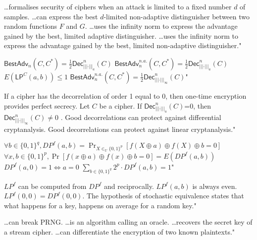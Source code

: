 {\ldots formalises security of ciphers when an attack is limited to a fixed number $d$ of samples.}
{\ldots can express the best $d$-limited non-adaptive distinguisher between two random functions $F$ and $G$.}
{\ldots uses the infinity norm to express the advantage gained by the best, limited adaptive distinguisher.}
{\ldots uses the infinity norm to express the advantage gained by the best, limited non-adaptive distinguisher."}

{$\mathsf{BestAdv}_n(C,C^\ast)=\frac{1}{2}\mathsf{Dec}^n_{\left|\left|\left|\cdot\right|\right|\right|_a}(C)$}
{$\mathsf{BestAdv}_n^{n.a.}(C,C^\ast)=\frac{1}{2}\mathsf{Dec}^n_{\left|\left|\left|\cdot\right|\right|\right|_a}(C)$}
{$E(\mathsf{LP}^{C}(a,b))\leq 1$}
{$\mathsf{BestAdv}_n^{n.a.}(C,C^\ast)=\frac{1}{2}\mathsf{Dec}^n_{\left|\left|\left|\cdot\right|\right|\right|_\infty}(C)$"}

{If a cipher has the decorrelation of order 1 equal to $0$, then one-time encryption provides perfect secrecy.}
{Let $C$ be a cipher. If $\mathsf{Dec}^n_{\left|\left|\left|\cdot\right|\right|\right|_a}(C)$=0, then $\mathsf{Dec}^n_{\left|\left|\left|\cdot\right|\right|\right|_\infty}(C) \neq$0 .}
{Good decorrelations can protect against differential cryptanalysis.}
{Good decorrelations can protect against linear cryptanalysis."}

{$\forall b\in\{0,1\}^q, DP^f(a,b)=\displaystyle\Pr_{X\in_U\{0,1\}^p}[f(X\oplus a)\oplus f(X)\oplus b=0]$}
{$\forall x,b\in\{0,1\}^p, \Pr[f(x\oplus a)\oplus f(x)\oplus b=0]=E(DP^f(a,b))$}
{$DP^f(a,0)=1\Longleftrightarrow a=0$}
{$\displaystyle\sum_{b\in\{0,1\}^q} 2^p\cdot DP^f(a,b)=1$"}

{$LP^f$ can be computed from $DP^f$ and reciprocally.}
{$LP^f(a,b)$ is always even.}
{$LP^f(0,0)=DP^f(0,0)$.}
{The hypothesis of stochastic equivalence states that what happens for a key, happens on average for a random key."}

{\ldots can break PRNG.}
{\ldots is an algorithm calling an oracle.}
{\ldots recovers the secret key of a stream cipher.}
{\ldots can differentiate the encryption of two known plaintexts."}


